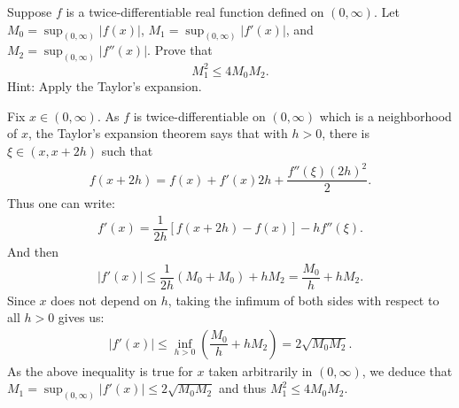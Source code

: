 \begin{problem}
Suppose $f$ is a twice-differentiable real function defined on $(0,\infty)$. Let $M_0 = \sup_{(0,\infty)} |f(x)|$, $M_1 = \sup_{(0,\infty)} |f'(x)|$, and $M_2 = \sup_{(0,\infty)} |f''(x)|$. Prove that
$$ M_1^2 \leq 4 M_0 M_2. $$
Hint: Apply the Taylor's expansion.
\begin{solution}
Fix $x \in (0,\infty)$. As $f$ is twice-differentiable on $(0,\infty)$ which is a neighborhood of $x$, the Taylor's expansion theorem says that with $h>0$, there is $\xi \in (x,x+2h)$ such that 
\begin{align*}
    f(x+2h) = f(x) + f'(x)2h + \dfrac{f''(\xi)(2h)^2}{2}.
\end{align*}
Thus one can write:
\begin{align*}
    f'(x) = \dfrac{1}{2h}\left[ f(x+2h) - f(x) \right] - h f'' (\xi) .
\end{align*}
And then 
\begin{align*}
    \left| f'(x) \right| \le \dfrac{1}{2h}(M_0 + M_0) + h M_2 = \dfrac{M_0}{h} + h M_2.
\end{align*}
Since $x$ does not depend on $h$, taking the infimum of both sides with respect to all $h>0$ gives us:
\begin{align*}
    \left| f'(x) \right| \le \inf\limits_{h>0} \left( \dfrac{M_0}{h} + hM_2\right) = 2 \sqrt{M_0 M_2}.
\end{align*}
As the above inequality is true for $x$ taken arbitrarily in $(0,\infty)$, we deduce that $M_1 = \sup_{(0,\infty)}|f'(x)| \le 2 \sqrt{M_0 M_2}$ and thus $M_1^2 \le 4 M_0 M_2$.
\end{solution}
\end{problem}

